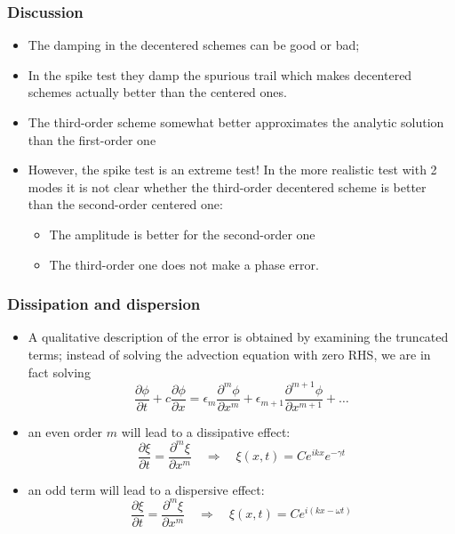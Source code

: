 \documentclass[aspectratio=43,9pt]{beamer}
\begin{document}
\begin{frame}
	\frametitle{Discussion}
	\vfill\begin{itemize}
		\item The damping in the decentered schemes can be good or bad;\vfill
		\item In the spike test they damp the spurious trail which makes decentered schemes actually better than the centered ones.\vfill
		\item The third-order scheme somewhat better approximates the analytic solution than the first-order one\vfill
		\item However, the spike test is an extreme test! In the more realistic test with 2 modes it is not clear whether the third-order decentered scheme is better than the second-order centered one:\vspace*{1ex}
			\begin{itemize}
				\item The amplitude is better for the second-order one
				\item The third-order one does not make a phase error.
			\end{itemize}
	\end{itemize}\vfill
\end{frame}
%
%
\begin{frame}
	\frametitle{Dissipation and dispersion}
	\vfill\begin{itemize}
		\item A qualitative description of the error is obtained by examining the truncated terms; instead of solving the advection equation with zero RHS, we are in fact solving
			\begin{equation*}
				\frac{\partial \phi}{\partial t}+c\frac{\partial \phi}{\partial x}=
					\epsilon_m\frac{\partial^m \phi}{\partial x^m}+
					\epsilon_{m+1}\frac{\partial^{m+1} \phi}{\partial x^{m+1}}+\ldots
			\end{equation*}\vfill
		\item an even order $m$ will lead to a dissipative effect:
			\begin{equation*}
				\frac{\partial \xi}{\partial t} = \frac{\partial^{m} \xi}{\partial x^{m}}
					\quad\Rightarrow\quad\xi (x,t) = C e^{ikx} e^{-\gamma t}
			\end{equation*}\vfill
		\item an odd term will lead to a dispersive effect:
			\begin{equation*}
				\frac{\partial \xi}{\partial t} = \frac{\partial^m \xi}{\partial x^m}
					\quad\Rightarrow\quad\xi (x,t) = C e^{i \left( kx - \omega t \right)}
			\end{equation*}
	\end{itemize}\vfill
\end{frame}
\end{document}
